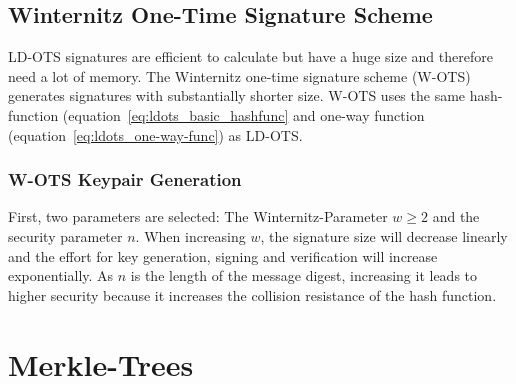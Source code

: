 \subsection{Winternitz One-Time Signature Scheme}
LD-OTS signatures are efficient to calculate but have a huge size and therefore need a lot of memory. The Winternitz one-time signature scheme (W-OTS) generates signatures with substantially shorter size. W-OTS uses the same hash-function (equation~\ref{eq:ldots_basic_hashfunc} and one-way function (equation~\ref{eq:ldots_one-way-func}) as LD-OTS. %

\subsubsection{W-OTS Keypair Generation}
First, two parameters are selected: The Winternitz-Parameter $w \geq 2$ and the security parameter $n$. When increasing $w$, the signature size will decrease linearly and the effort for key generation, signing and verification will increase exponentially. As $n$ is the length of the message digest, increasing it leads to higher security because it increases the collision resistance of the hash function. 






\section{Merkle-Trees}
